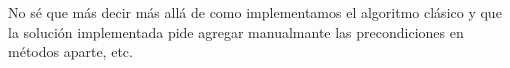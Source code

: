 No sé que más decir más allá de como implementamos el algoritmo clásico y que la solución implementada pide agregar manualmante las precondiciones en métodos aparte, etc.